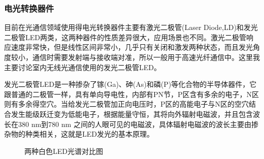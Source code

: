 \subsubsection{电光转换器件}
目前在光通信领域使用得电光转换器件主要有激光二极管(Laser Diode,LD)和发光二极管LED两类，这两种器件的性质差异很大，应用场景也不同。激光二极管响应速度非常快，但是线性区间非常小，几乎只有关闭和激发两种状态，而且发光角度较小，通信时需要发射端与接收端对准，所以一般用于高速光纤通信中。这里我主要讨论室内无线光通信使用的发光二极管LED。

发光二极管LED是一种掺杂了镓(Ga)、砷(As)和磷(P)等化合物的半导体器件，它跟普通的二极管一样，具有单向导电性，内部有PN节，P区含有多余的电子，N区则有多余得空穴。当给发光二极管加正向电压时，P区的高能电子与N区的空穴结合发生能级跃迁变为低能电子，根据能量守恒，其将向外辐射电磁波，并且包含波长在380 nm到780 nm 之间的人眼可见的电磁波，具体辐射电磁波的波长主要由掺杂物的种类相关，这就是LED发光的基本原理。

\begin{figure}[htbp]
    \centering
    \caption{两种白色LED光谱对比图}
    \label{fig:WhiteLED}
\end{figure}

